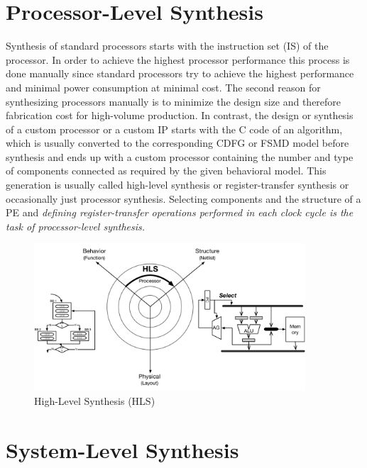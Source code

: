 \section{Processor-Level Synthesis}

Synthesis of standard processors starts with the instruction set (IS) of the processor.
In order to achieve the highest processor performance this process is done manually since standard processors try to achieve the highest performance and minimal power consumption at minimal cost.
The second reason for synthesizing processors manually is to minimize the design size and therefore fabrication cost for high-volume production.
In contrast, the design or synthesis of a custom processor or a custom IP starts with the C code of an algorithm, which is usually converted to the corresponding CDFG or FSMD model before synthesis and ends up with a custom processor containing the number and type of components connected as required by the given behavioral model.
This generation is usually called high-level synthesis or register-transfer synthesis or occasionally just processor synthesis.
Selecting components and the structure of a PE and \emph{defining register-transfer operations performed in each clock cycle is the task of processor-level synthesis.}

\begin{figure}[h]
    \centering
    \includegraphics[width=0.9\textwidth]{figures/Introduction/processor-synthesis.pdf}
    \caption{High-Level Synthesis (HLS)}
    \label{fig:proc_synthesis}
\end{figure}


\section{System-Level Synthesis}

